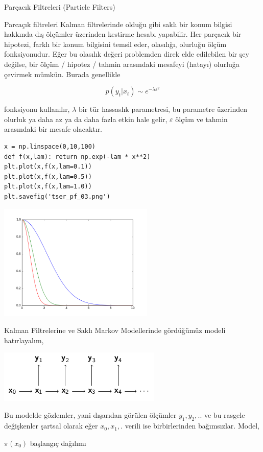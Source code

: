 \documentclass[12pt,fleqn]{article}\usepackage{../../common}
\begin{document}
Parçacık Filtreleri (Particle Filters)

Parcaçık filtreleri Kalman filtrelerinde olduğu gibi saklı bir konum
bilgisi hakkında dış ölçümler üzerinden kestirme hesabı yapabilir. Her
parçacık bir hipotezi, farklı bir konum bilgisini temsil eder, olasılığı,
olurluğu ölçüm fonksiyonudur.  Eğer bu olasılık değeri problemden direk
elde edilebilen bir şey değilse, bir ölçüm / hipotez / tahmin arasındaki
mesafeyi (hatayı) olurluğa çevirmek mümkün. Burada genellikle

$$ p(y_t|x_t) \sim e^{-\lambda \varepsilon^2}$$

fonksiyonu kullanılır, $\lambda$ bir tür hassaslık parametresi, bu
parametre üzerinden olurluk ya daha az ya da daha fazla etkin hale gelir,
$\varepsilon$ ölçüm ve tahmin arasındaki bir mesafe olacaktır. 

\begin{verbatim}
x = np.linspace(0,10,100)
def f(x,lam): return np.exp(-lam * x**2)
plt.plot(x,f(x,lam=0.1))
plt.plot(x,f(x,lam=0.5))
plt.plot(x,f(x,lam=1.0))
plt.savefig('tser_pf_03.png')
\end{verbatim}

\includegraphics[width=20em]{tser_pf_03.png}

Kalman Filtrelerine ve Saklı Markov Modellerinde gördüğümüz modeli
hatırlayalım, 

\includegraphics[height=2.5cm]{tser_pf_02.png}

Bu modelde gözlemler, yani dışarıdan görülen ölçümler $y_1,y_2,..$ ve bu rasgele
değişkenler şartsal olarak eğer $x_0,x_1,.$ verili ise birbirlerinden
bağımsızlar. Model,

$\pi(x_0)$ başlangıç dağılımı
\end{document}
